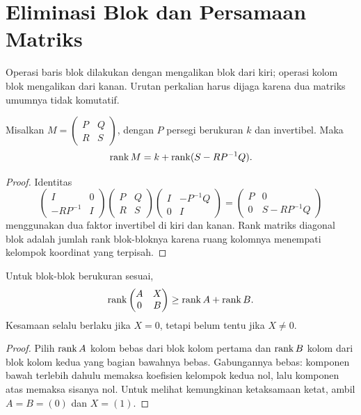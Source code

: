 \section{Eliminasi Blok dan Persamaan Matriks}
\label{rank:blok}

Operasi baris blok dilakukan dengan mengalikan blok dari kiri;
operasi kolom blok mengalikan dari kanan. Urutan perkalian harus dijaga
karena dua matriks umumnya tidak komutatif.

\begin{teorema}
    Misalkan
    $M=\begin{pmatrix}P&Q\\R&S\end{pmatrix}$, dengan $P$ persegi
    berukuran $k$ dan invertibel. Maka
    \[
        \operatorname{rank} M=k+\operatorname{rank}(S-RP^{-1}Q).
    \]
\end{teorema}
\begin{proof}
    Identitas
    \[
        \begin{pmatrix}I&0\\-RP^{-1}&I\end{pmatrix}
        \begin{pmatrix}P&Q\\R&S\end{pmatrix}
        \begin{pmatrix}I&-P^{-1}Q\\0&I\end{pmatrix}
        =\begin{pmatrix}P&0\\0&S-RP^{-1}Q\end{pmatrix}
    \]
    menggunakan dua faktor invertibel di kiri dan kanan. Rank matriks
    diagonal blok adalah jumlah rank blok-bloknya karena ruang kolomnya
    menempati kelompok koordinat yang terpisah.
\end{proof}

\begin{prop}
    \label{rank:segitiga-blok}
    Untuk blok-blok berukuran sesuai,
    \[
        \operatorname{rank}\begin{pmatrix}A&X\\0&B\end{pmatrix}
        \ge\operatorname{rank} A+\operatorname{rank} B.
    \]
    Kesamaan selalu berlaku jika $X=0$, tetapi belum tentu jika $X\ne0$.
\end{prop}
\begin{proof}
    Pilih $\operatorname{rank} A$ kolom bebas dari blok kolom pertama dan
    $\operatorname{rank} B$ kolom dari blok kolom kedua yang bagian bawahnya bebas.
    Gabungannya bebas: komponen bawah terlebih dahulu memaksa koefisien
    kelompok kedua nol, lalu komponen atas memaksa sisanya nol.
    Untuk melihat kemungkinan ketaksamaan ketat, ambil
    $A=B=(0)$ dan $X=(1)$.
\end{proof}

